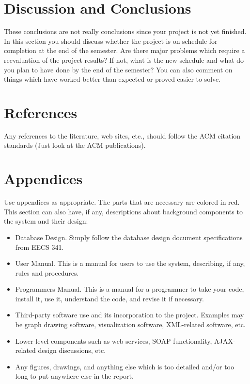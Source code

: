 \documentclass[letterpaper,12pt]{article}
\begin{document}
\newpage



\section{Discussion and Conclusions}
These conclusions are not really conclusions since your project is not yet
finished. In this section you should discuss whether the project is on schedule
for completion at the end of the semester. Are there major problems which
require a reevaluation of the project results?  If not, what is the new schedule
and what do you plan to have done by the end of the semester?  You can also
comment on things which have worked better than expected or proved easier to
solve.

\newpage



\section{References}
Any references to the literature, web sites, etc., should follow the ACM
citation standards (Just look at the ACM publications).

\newpage



\section{Appendices}
Use appendices as appropriate. The parts that are necessary are colored in red.
This section can also have, if any, descriptions about background components to
the system and their design:

\begin{itemize}
  \item Database Design.  Simply follow the database design document
  specifications from EECS 341.
  \item User Manual.  This is a manual for users to use the system, describing,
  if any, rules and procedures.
  \item Programmers Manual.  This is a manual for a programmer to take your
  code, install it, use it, understand the code, and revise it if necessary. 
  \item Third-party software use and its incorporation to the project.  Examples
  may be graph drawing software, visualization software, XML-related software,
  etc.
  \item Lower-level components such as web services, SOAP functionality,
  AJAX-related design discussions, etc. 
  \item Any figures, drawings, and anything else which is too detailed and/or
  too long to put anywhere else in the report. 
\end{itemize}

\newpage
\end{document}
